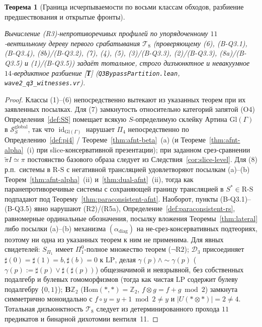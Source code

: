 \documentclass[11pt]{article}
\theoremstyle{plain}
\newtheorem{theorem}{Теорема}[section]
\theoremstyle{definition}
\newcommand{\RS}{\mathrm{R\text{-}S}}
\newcommand{\cS}{\mathcal{S}}
\newcommand{\Hom}{\mathrm{Hom}}
\newcommand{\tpi}{\widetilde{\pi}}
\DeclareMathOperator{\id}{id}
\begin{document}
\begin{theorem}[Граница исчерпываемости по восьми классам обходов, разбиение предшествования и открытые фронты]
\begin{enumerate}[nosep,label=(\roman*)]
  Вычисление (R3)-непротиворечивых профилей по упорядоченному $11$-вентильному дереву первого срабатывания $\mathcal{T}_8$ (проверяющему (6), (B-Q3.1), (B-Q3.4), (8b)/(B-Q3.2), (7), (4), (5), (3)/(B-Q3.3), (2)/(B-Q3.3), (8a)/(B-Q3.5) и (1)/(B-Q3.5)) задаёт тотальное, строго дизъюнктное и невакуумное $14$-вердиктное разбиение \textup{[\textbf{Т}]} (\texttt{Q3BypassPartition.lean}, \texttt{wave2\_q3\_witnesses.vr}).
\end{enumerate}
\end{theorem}
\begin{proof}
Классы (1)--(6) непосредственно вытекают из указанных теорем при их заявленных посылках. Для (7) замкнутость относительно категорий запятой (O4) Определения~\ref{def:SS} помещает всякую $S$-определимую склейку Артина $\mathrm{Gl}(\Gamma)$ в $\cS_S^{\mathrm{global}}$, так что $\id_{\mathrm{Gl}(\Gamma)}$ нарушает $\Pi_4$ непосредственно по Определению~\ref{def:pi4} / Теореме~\ref{thm:afnt-beta}~(a) (и Теореме~\ref{thm:afnt-alpha}~(i) при slice-консервативной презентации); при заданном срез-сравнении $\tpi I \simeq \pi$ постоянство базового образа следует из Следствия~\ref{cor:slice-level}. Для (8) р.п.\ системы в $\RS$ с негативной трансляцией удовлетворяют посылкам (a)--(b) Теорем~\ref{thm:afnt-alpha}~(ii) и~\ref{thm:dual-afnt}~(ii), тогда как паранепротиворечивые системы с сохраняющей границу трансляцией в $S^* \in \RS$ подпадают под Теорему~\ref{thm:paraconsistent-afnt}. Наоборот, пункты (B-Q3.1)--(B-Q3.5) явно нарушают (R2)/(R5a), Определение~\ref{def:paraconsistent-rs}, равномерные ординальные обозначения, посылку вложения Теоремы~\ref{thm:lateral} либо посылки (a)--(b) механизма $(\alpha_{\mathrm{diag}})$ на не-срез-консервативных подтеориях, поэтому ни одна из указанных теорем к ним не применима. Для явных свидетелей: $S_{\Pi_1}$ имеет $\Pi_1^0$-полное множество теорем ($\neg\mathrm{R2}$); $\mathcal{D}_3$ присоединяет $\sharp(0)=\sharp(1)=b, \sharp(b)=0$ к $\mathrm{LP}$, делая $\gamma(p) \wedge \sim\gamma(p)$ ($\gamma(p):=\sharp(p)\vee\sharp(\sharp(p))$) общезначимой и невзрывной, без собственных подалгебр и булевых гомоморфизмов (тогда как чистая $\mathrm{LP}$ содержит булеву подалгебру $\{0,1\}$); $\mathbf{B}\mathbb{Z}_2$ ($\Hom(*,*)=\mathbb{Z}_2$, $f\otimes g = f+g\bmod 2$) замкнута симметрично моноидально с $f \circ y = y+1\bmod 2 \neq y$ и $|U(*\otimes *)|=2\neq 4$. Тотальная дизъюнктность $\mathcal{T}_8$ следует из детерминированного прохода $11$ предикатов и бинарной дихотомии вентиля~11.
\end{proof}
\end{document}
